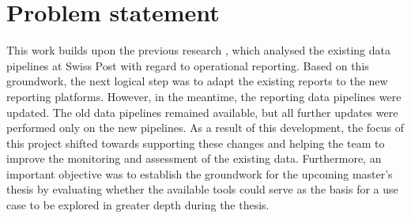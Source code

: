 
\section{Problem statement}
\label{ResearchProblemState}

This work builds upon the previous research \cite{Roccaro2026_Project1}, which analysed the existing data pipelines at Swiss Post with regard to operational reporting. Based on this groundwork, the next logical step was to adapt the existing reports to the new reporting platforms. However, in the meantime, the reporting data pipelines were updated. The old data pipelines remained available, but all further updates were performed only on the new pipelines. As a result of this development, the focus of this project shifted towards supporting these changes and helping the team to improve the monitoring and assessment of the existing data. Furthermore, an important objective was to establish the groundwork for the upcoming master's thesis by evaluating whether the available tools could serve as the basis for a use case to be explored in greater depth during the thesis.

